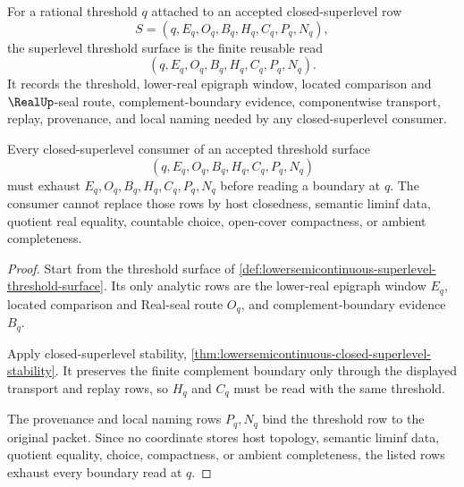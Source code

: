 \begin{definition}
\label{def:lowersemicontinuous-superlevel-threshold-surface}
For a rational threshold $q$ attached to an accepted closed-superlevel row
$$
S=(q,E_q,O_q,B_q,H_q,C_q,P_q,N_q),
$$
the superlevel threshold surface is the finite reusable read
$$
(q,E_q,O_q,B_q,H_q,C_q,P_q,N_q).
$$
It records the threshold, lower-real epigraph window, located comparison and $\RealUp$-seal route, complement-boundary evidence, componentwise transport, replay, provenance, and local naming needed by any closed-superlevel consumer.
\end{definition}

\begin{theorem}
\label{thm:lowersemicontinuous-closed-superlevel-threshold-exhaustion}
Every closed-superlevel consumer of an accepted threshold surface
$$
(q,E_q,O_q,B_q,H_q,C_q,P_q,N_q)
$$
must exhaust $E_q,O_q,B_q,H_q,C_q,P_q,N_q$ before reading a boundary at $q$. The consumer cannot replace those rows by host closedness, semantic liminf data, quotient real equality, countable choice, open-cover compactness, or ambient completeness.
\end{theorem}
\begin{proof}
Start from the threshold surface of \autoref{def:lowersemicontinuous-superlevel-threshold-surface}. Its only analytic rows are the lower-real epigraph window $E_q$, located comparison and Real-seal route $O_q$, and complement-boundary evidence $B_q$.

Apply closed-superlevel stability, \autoref{thm:lowersemicontinuous-closed-superlevel-stability}. It preserves the finite complement boundary only through the displayed transport and replay rows, so $H_q$ and $C_q$ must be read with the same threshold.

The provenance and local naming rows $P_q,N_q$ bind the threshold row to the original packet. Since no coordinate stores host topology, semantic liminf data, quotient equality, choice, compactness, or ambient completeness, the listed rows exhaust every boundary read at $q$.
\end{proof}

